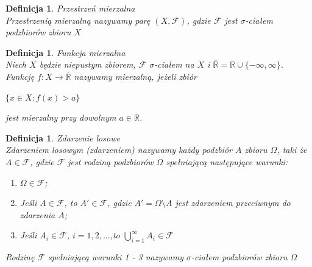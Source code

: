 \documentclass[12pt,a4paper]{report}
\newtheorem{definition}[theorem]{Definicja}
\begin{document}
\begin{definition}{Przestrzeń mierzalna \cite[Rozdział 2.10]{billingsley1987}\\}
Przestrzenią mierzalną nazywamy parę $(X, \mathcal{F})$, gdzie $\mathcal{F}$ jest $\sigma$-ciałem podzbiorów zbioru $X$\\
\end{definition}

\begin{definition}{Funkcja mierzalna \cite[w oparciu o rozdział 8.2]{rudnicki2006}\\}
Niech $X$ będzie niepustym zbiorem, $\mathcal{F}$  $\sigma$-ciałem na $X$ i $\overline{\mathbb{R}} = \mathbb{R} \cup \{-\infty, \infty \}$. Funkcję $f: X \rightarrow \overline{\mathbb{R}}$ nazywamy mierzalną, jeżeli zbiór
\begin{center}
$\{ x \in X: f(x) > a \}$
\end{center}
jest mierzalny przy dowolnym $a \in \mathbb{R}$.\\
\end{definition}

\begin{definition}{Zdarzenie losowe \cite[w oparciu o rozdział 1.1]{krysicki1999}\\}
Zdarzeniem losowym (zdarzeniem) nazywamy każdy podzbiór $\textit{A}$ zbioru $\Omega$, taki że  $A \in \mathcal{F}$, gdzie $\mathcal{F}$ jest rodziną podzbiorów $\Omega$ spełniającą następujące warunki:
\begin{enumerate}
\item $\Omega \in \mathcal{F}$;
\item Jeśli $A \in \mathcal{F}$, to $\textit{A$'$} \in \mathcal{F}$, gdzie $\textit{A$'$} = \Omega \setminus A $ jest zdarzeniem przeciwnym do zdarzenia $\textit{A}$;
\item Jeśli $\textit{A}_{i} \in \mathcal{F}$, $i= 1, 2, ...$,to $\bigcup\limits_{i=1}^{\infty} A_{i} \in \mathcal{F} $
\end{enumerate}
Rodzinę $\mathcal{F}$ spełniającą warunki 1 - 3 nazywamy $\sigma$-ciałem podzbiorów zbioru $\Omega$\\
\end{definition}
\end{document}
